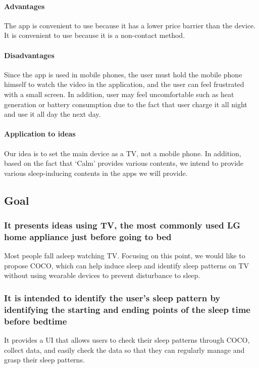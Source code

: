 \documentclass[conference]{IEEEtran}
\begin{document}
\paragraph{Advantages}
The app is convenient to use because it has a lower price barrier than the device. It is convenient to use because it is a non-contact method.
\paragraph{Disadvantages}
Since the app is used in mobile phones, the user must hold the mobile phone himself to watch the video in the application, and the user can feel frustrated with a small screen. In addition, user may feel uncomfortable such as heat generation or battery consumption due to the fact that user charge it all night and use it all day the next day.
\paragraph{Application to ideas}
Our idea is to set the main device as a TV, not a mobile phone. In addition, based on the fact that ‘Calm’ provides various contents, we intend to provide various sleep-inducing contents in the apps we will provide.
\vspace{1\baselineskip}
\subsection{Goal}
\subsubsection{It presents ideas using TV, the most commonly used LG home appliance just before going to bed}
Most people fall asleep watching TV. Focusing on this point, we would like to propose COCO, which can help induce sleep and identify sleep patterns on TV without using wearable devices to prevent disturbance to sleep.
\vspace{1\baselineskip}
\subsubsection{It is intended to identify the user's sleep pattern by identifying the starting and ending points of the sleep time before bedtime}
It provides a UI that allows users to check their sleep patterns through COCO, collect data, and easily check the data so that they can regularly manage and grasp their sleep patterns.
\vspace{1\baselineskip}
\end{document}
